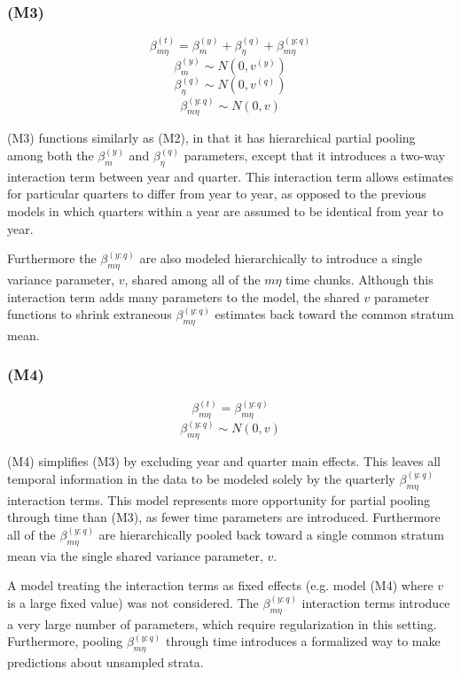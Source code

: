 \documentclass[12pt]{article}
\begin{document}
\subsubsection{(M3)}\label{m3}

\[\beta^{(t)}_{m\eta} = \beta^{(y)}_{m} + \beta^{(q)}_{\eta} + \beta^{(y:q)}_{m\eta}\]
\[\beta^{(y)}_{m} \sim N(0, v^{(y)})\]
\[\beta^{(q)}_{\eta} \sim N(0, v^{(q)})\]
\[\beta^{(y:q)}_{m\eta} \sim N(0, v)\]

(M3) functions similarly as (M2), in that it has hierarchical partial
pooling among both the \(\beta^{(y)}_{m}\) and \(\beta^{(q)}_{\eta}\)
parameters, except that it introduces a two-way interaction term between
year and quarter. This interaction term allows estimates for particular
quarters to differ from year to year, as opposed to the previous models
in which quarters within a year are assumed to be identical from year to
year.

Furthermore the \(\beta^{(y:q)}_{m\eta}\) are also modeled
hierarchically to introduce a single variance parameter, \(v\), shared
among all of the \(m\eta\) time chunks. Although this interaction term
adds many parameters to the model, the shared \(v\) parameter functions
to shrink extraneous \(\beta^{(y:q)}_{m\eta}\) estimates back toward the
common stratum mean.

\subsubsection{(M4)}\label{m4}

\[\beta^{(t)}_{m\eta} = \beta^{(y:q)}_{m\eta}\]
\[\beta^{(y:q)}_{m\eta} \sim N(0, v)\]

(M4) simplifies (M3) by excluding year and quarter main effects. This
leaves all temporal information in the data to be modeled solely by the
quarterly \(\beta^{(y:q)}_{m\eta}\) interaction terms. This model
represents more opportunity for partial pooling through time than (M3),
as fewer time parameters are introduced. Furthermore all of the
\(\beta^{(y:q)}_{m\eta}\) are hierarchically pooled back toward a single
common stratum mean via the single shared variance parameter, \(v\). 

A model treating the interaction terms as fixed effects (e.g. model (M4) where 
$v$ is a large fixed value) was not considered. The \(\beta^{(y:q)}_{m\eta}\) 
interaction terms introduce a very large number of parameters, which require 
regularization in this setting. Furthermore, pooling \(\beta^{(y:q)}_{m\eta}\) 
through time introduces a formalized way to make predictions about unsampled 
strata.
\end{document}

